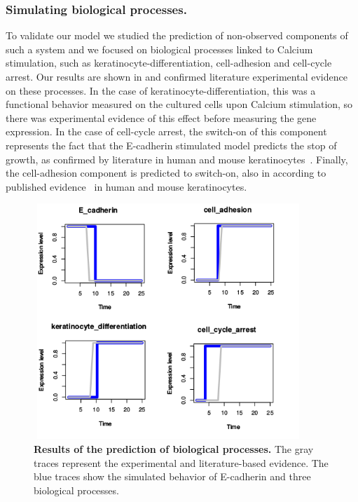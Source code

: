 \subsubsection{Simulating biological processes.}
To validate our model we studied the prediction of non-observed components of such a system and we focused on biological processes linked 
to Calcium stimulation, such as keratinocyte-differentiation, cell-adhesion and cell-cycle arrest.
Our results are shown in  and confirmed literature experimental evidence on these processes.
In the case of keratinocyte-differentiation, this was a functional behavior measured on the cultured cells upon Calcium stimulation,
 so there was experimental evidence of this effect before measuring the gene expression.  
In the case of cell-cycle arrest, the switch-on of this component represents the fact that the E-cadherin stimulated model predicts the stop 
of growth, as confirmed by literature in human and mouse keratinocytes~\cite{Kolly2005}.
Finally, the cell-adhesion component is predicted to switch-on, also in according to published evidence~\cite{Tu2011} in human and mouse keratinocytes.

\begin{figure}[H]
\centering
\includegraphics[width=4in,height=3.5in]{images/key_nodes1.png}
\caption{{\bf Results of the prediction of biological processes.} The gray traces represent the experimental and literature-based evidence.
The blue traces show the simulated behavior of E-cadherin and three biological processes.}
\label{fig:knodes}
\end{figure}

